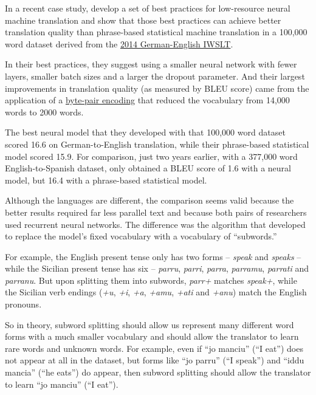 \documentclass[10pt,letterpaper]{article}
\begin{document}
In a recent case study, \citet{sennrich2019loresnmt}
develop a set of best practices for low-resource neural machine translation and
show that those best practices can achieve better translation quality than
phrase-based statistical machine translation in a 100,000 word dataset derived from the
\href{https://sites.google.com/site/iwsltevaluation2014/}{2014 German-English IWSLT}.

In their best practices, they suggest using a smaller neural network with fewer layers,
smaller batch sizes and a larger the dropout parameter.  And their largest improvements
in translation quality (as measured by BLEU score) came from the application of a
\href{https://github.com/rsennrich/subword-nmt}{byte-pair encoding}
that reduced the vocabulary from 14,000 words to 2000 words.

\newpage

The best neural model that they developed with that 100,000 word dataset scored 16.6
on German-to-English translation, while their phrase-based statistical model scored 15.9.
For comparison, just two years earlier, with a 377,000 word English-to-Spanish dataset,
\citet{koehnknowles2017} only obtained a BLEU score of 1.6 with a neural model,
but 16.4 with a phrase-based statistical model.

Although the languages are different, the comparison seems valid because the better results required 
far less parallel text and because both pairs of researchers used recurrent neural networks.
The difference was the algorithm that \citet{sennrich2016subword}
developed to replace the model's fixed vocabulary with a vocabulary of ``subwords.''

For example, the English present tense only has two forms -- \textit{speak} and \textit{speaks} -- 
while the Sicilian present tense has six -- \textit{parru}, \textit{parri}, \textit{parra}, 
\textit{parramu}, \textit{parrati} and \textit{parranu}. 
But upon splitting them into subwords, \textit{parr+} matches \textit{speak+},
while the Sicilian verb endings
(\textit{+u}, \textit{+i}, \textit{+a}, \textit{+amu}, \textit{+ati} and \textit{+anu})
match the English pronouns.

So in theory, subword splitting should allow us represent many different word forms with a much smaller vocabulary
and should allow the translator to learn rare words and unknown words.
For example, even if ``jo manciu'' (``I eat'') does not appear at all in the dataset,
but forms like ``jo parru'' (``I speak'') and ``iddu mancia'' (``he eats'') do appear,
then subword splitting should allow the translator to learn ``jo manciu'' (``I eat'').
\end{document}
